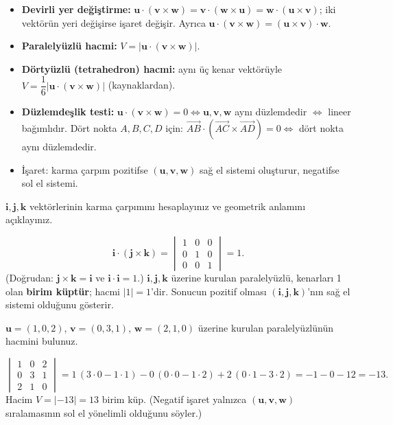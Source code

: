 \begin{teorem}
\begin{itemize}
\item \textbf{Devirli yer değiştirme:} $\mathbf u\cdot(\mathbf v\times\mathbf w)=\mathbf v\cdot(\mathbf w\times\mathbf u)=\mathbf w\cdot(\mathbf u\times\mathbf v)$; iki vektörün yeri değişirse işaret değişir. Ayrıca $\mathbf u\cdot(\mathbf v\times\mathbf w)=(\mathbf u\times\mathbf v)\cdot\mathbf w$.
\item \textbf{Paralelyüzlü hacmi:} $V=|\mathbf u\cdot(\mathbf v\times\mathbf w)|$.
\item \textbf{Dörtyüzlü (tetrahedron) hacmi:} aynı üç kenar vektörüyle $V=\dfrac16|\mathbf u\cdot(\mathbf v\times\mathbf w)|$ (kaynaklardan).
\item \textbf{Düzlemdeşlik testi:} $\mathbf u\cdot(\mathbf v\times\mathbf w)=0\iff\mathbf u,\mathbf v,\mathbf w$ aynı düzlemdedir $\iff$ lineer bağımlıdır. Dört nokta $A,B,C,D$ için: $\overrightarrow{AB}\cdot(\overrightarrow{AC}\times\overrightarrow{AD})=0\iff$ dört nokta aynı düzlemdedir.
\item İşaret: karma çarpım pozitifse $(\mathbf u,\mathbf v,\mathbf w)$ sağ el sistemi oluşturur, negatifse sol el sistemi.
\end{itemize}
\end{teorem}

\begin{soru}
$\mathbf i,\mathbf j,\mathbf k$ vektörlerinin karma çarpımını hesaplayınız ve geometrik anlamını açıklayınız.
\end{soru}
\begin{cevap}
\[
\mathbf i\cdot(\mathbf j\times\mathbf k)=\begin{vmatrix}1&0&0\\0&1&0\\0&0&1\end{vmatrix}=1 .
\]
(Doğrudan: $\mathbf j\times\mathbf k=\mathbf i$ ve $\mathbf i\cdot\mathbf i=1$.) $\mathbf i,\mathbf j,\mathbf k$ üzerine kurulan paralelyüzlü, kenarları 1 olan \textbf{birim küptür}; hacmi $|1|=1$'dir. Sonucun pozitif olması $(\mathbf i,\mathbf j,\mathbf k)$'nın sağ el sistemi olduğunu gösterir.
\end{cevap}

\begin{soru}
$\mathbf u=(1,0,2)$, $\mathbf v=(0,3,1)$, $\mathbf w=(2,1,0)$ üzerine kurulan paralelyüzlünün hacmini bulunuz.
\end{soru}
\begin{cevap}
\[
\begin{vmatrix}1&0&2\\0&3&1\\2&1&0\end{vmatrix}
=1\,(3\cdot0-1\cdot1)-0\,(0\cdot0-1\cdot2)+2\,(0\cdot1-3\cdot2)=-1-0-12=-13 .
\]
Hacim $V=|-13|=13$ birim küp. (Negatif işaret yalnızca $(\mathbf u,\mathbf v,\mathbf w)$ sıralamasının sol el yönelimli olduğunu söyler.)
\end{cevap}


